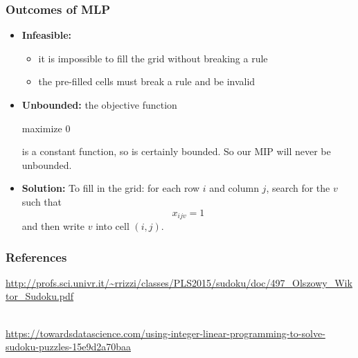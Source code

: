 \documentclass{beamer}
\newcommand{\stanza}{ \\~\ }
\begin{document}
\begin{frame} \frametitle{Outcomes of MLP}
  \begin{itemize}
  \item \textbf{Infeasible:}
    \begin{itemize}
    \item it is impossible to fill the grid without breaking a rule
    \item the pre-filled cells must break a rule and be invalid
    \end{itemize}
  \item \textbf{Unbounded:} the objective function

    maximize 0

    is a constant function, so is certainly bounded. So our MIP will
    never be unbounded.

  \item \textbf{Solution:} To fill in the grid: for each row $i$ and
    column $j$, search for the $v$ such that
    \[ x_{ijv}=1 \]
    and then write $v$ into cell $(i, j).$

  \end{itemize}
\end{frame}

\begin{frame} \frametitle{References}
  \url{http://profs.sci.univr.it/~rrizzi/classes/PLS2015/sudoku/doc/497_Olszowy_Wiktor_Sudoku.pdf}
  \stanza

  \url{https://towardsdatascience.com/using-integer-linear-programming-to-solve-sudoku-puzzles-15e9d2a70baa}
\end{frame}
\end{document}
